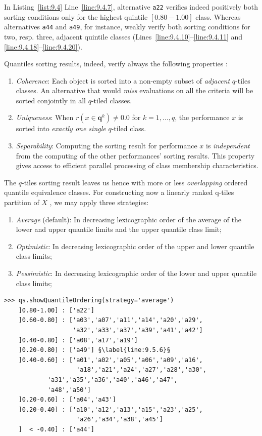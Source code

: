 In Listing~\vref{list:9.4} Line~\ref{line:9.4.7}, alternative \texttt{a22} verifies indeed positively both sorting conditions only for the highest quintile $[0.80 - 1.00]$ class. Whereas alternatives \texttt{a44} and \texttt{a49}, for instance, weakly verify both sorting conditions for two, resp. three, adjacent quintile classes (Lines~\ref{line:9.4.10}--\ref{line:9.4.11} and \ref{line:9.4.18}--\ref{line:9.4.20}).  

Quantiles sorting results, indeed, verify always the following properties \citep{ADT-L10}:
\begin{property}\label{prop:9.1}
\begin{enumerate}[leftmargin=0.5cm,rightmargin=0.5cm,topsep=1pt]
\item \emph{Coherence}: Each object is sorted into a non-empty subset of \emph{adjacent} $q$-tiles classes. An alternative that would \emph{miss} evaluations on all the criteria will be sorted conjointly in all $q$-tiled classes.
\item \emph{Uniqueness}: When $r(x \in \mathbf{q}^k) \neq 0.0$  for $k = 1, ..., q$, the performance $x$ is sorted into \emph{exactly one single} $q$-tiled class.
\item \emph{Separability}: Computing the sorting result for performance $x$ is \emph{independent} from the computing of the other performances’ sorting results. This property gives access to efficient parallel processing of class membership characteristics.
\end{enumerate}
\end{property}

The $q$-tiles sorting result leaves us hence with more or less \emph{overlapping} ordered quantile equivalence classes. For constructing now a linearly ranked q-tiles partition of $X$ , we may apply three strategies:
\begin{enumerate}[leftmargin=0.5cm,rightmargin=0.5cm,topsep=1pt]
\item \emph{Average} (default): In decreasing lexicographic order of the average of the lower and upper quantile limits and the upper quantile class limit;
\item \emph{Optimistic}: In decreasing lexicographic order of the upper and lower quantile class limits;
\item \emph{Pessimistic}: In decreasing lexicographic order of the lower and upper quantile class limits;
\end{enumerate}
\begin{lstlisting}[caption={Weakly ranking the quintiles sorting result},label=list:9.5]
>>> qs.showQuantileOrdering(strategy='average')
    ]0.80-1.00] : ['a22']
    ]0.60-0.80] : ['a03','a07','a11','a14','a20','a29',
                   'a32','a33','a37','a39','a41','a42']
    ]0.40-0.80] : ['a08','a17','a19']
    ]0.20-0.80] : ['a49'] §\label{line:9.5.6}§
    ]0.40-0.60] : ['a01','a02','a05','a06','a09','a16',
                    'a18','a21','a24','a27','a28','a30',
		    'a31','a35','a36','a40','a46','a47',
		    'a48','a50']
    ]0.20-0.60] : ['a04','a43']
    ]0.20-0.40] : ['a10','a12','a13','a15','a23','a25',
                    'a26','a34','a38','a45']
    ]  < -0.40] : ['a44']
\end{lstlisting}

